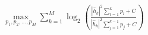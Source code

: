 \documentclass[preview]{standalone}
\begin{document}
\begin{align*}
\max_{p_1, p_2,...,p_M} \sum_{k=1}^{M} \log_2 \left(\frac{\left|{\hat{h}_k}\right|^2\sum_{l=1}^{k}p_l+ C}{\left|{\hat{h}_k}\right|^2\sum_{j=1}^{k-1}p_j+ C}\right)
\end{align*}
\end{document}
